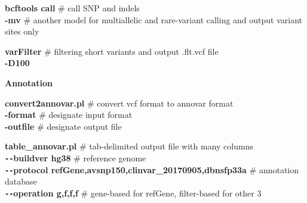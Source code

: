 \documentclass[a4paper, 12pt]{article}
\begin{document}
\begin{tcolorbox}
				\vspace*{1\baselineskip}
				\setlength{\hangindent}{2em}
				\textbf{bcftools call} \hfill \# call SNP and indels
				\\\textbf{-mv} \hfill \# another model for multiallelic and rare-variant calling and output variant sites only
				
				\vspace*{1\baselineskip}
				\setlength{\hangindent}{2em}
				\textbf{varFilter} \hfill \# filtering short variants and output .flt.vcf file
				\\\textbf{-D100}
				
				\vspace*{1\baselineskip}
				\textbf{Annotation}
				
				\setlength{\hangindent}{2em}
				\textbf{convert2annovar.pl} \hfill \# convert vcf format to annovar format
				\\\textbf{-format} \hfill \# designate input format
				\\\textbf{-outfile} \hfill \# designate output file
				
				\vspace*{1\baselineskip}
				\setlength{\hangindent}{2em}
				\textbf{table\_annovar.pl} \hfill \# tab-delimited output file with many columns
				\\\textbf{\texttt{-{}-}buildver hg38} \hfill \# reference genome
				\\\textbf{\texttt{-{}-}protocol refGene,avsnp150,clinvar\_20170905,dbnsfp33a} \hfill \# annotation database
				\\\textbf{\texttt{-{}-}operation g,f,f,f} \hfill \# gene-based for refGene, filter-based for other 3
				
			\end{tcolorbox}
	
		\printbibliography
		
\end{document}
